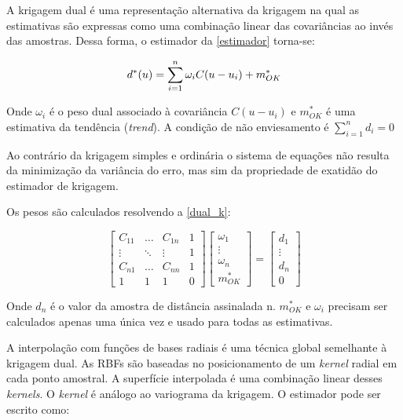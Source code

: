  \label{dksection}

A krigagem dual \cite{royer1984dual} é uma representação alternativa da krigagem na qual as estimativas são expressas como uma combinação linear das covariâncias ao invés das amostras. Dessa forma, o estimador da \autoref{estimador} torna-se:

\begin{equation}
\label{dk}
d^*(u)=\sum_{i=1}^{n} \omega_i C(u-u_i) + m^*_{OK} \\
\end{equation}

Onde $\omega_i$ é o peso dual associado à covariância $C(u-u_i)$ e $m^*_{OK}$ é uma estimativa da tendência (\textit{trend}). A condição de não enviesamento é $\sum_{i=1}^{n} d_i=0$

Ao contrário da krigagem simples e ordinária o sistema de equações não resulta da minimização da variância do erro, mas sim da propriedade de exatidão do estimador de krigagem.

Os pesos são calculados resolvendo a \autoref{dual_k}:

\begin{equation}
    \label{dual_k}
    \begin{bmatrix} 
    C_{11}&\dots&C_{1n}&1\\
    \vdots&\ddots&\vdots&1\\
    C_{n1}&\dots&C_{nn}&1\\ 
    1&1&1&0
    \end{bmatrix}
    \begin{bmatrix} 
    \omega_{1}\\
    \vdots\\
    \omega_{n}\\ 
    m^*_{OK}
    \end{bmatrix}
    =
    \begin{bmatrix} 
    d_{1}\\
    \vdots\\
    d_{n}\\ 
    0
    \end{bmatrix}
\end{equation}

Onde $d_{n}$ é o valor da amostra de distância assinalada n. $m^*_{OK}$ e $\omega_i$ precisam ser calculados apenas uma única vez e usado para todas as estimativas.


A interpolação com funções de bases radiais \cite{fasshauer2007meshfree} é uma técnica global semelhante à krigagem dual. As RBFs são baseadas no posicionamento de um \textit{kernel} radial em cada ponto amostral. A superfície interpolada é uma combinação linear desses \textit{kernels}. O \textit{kernel} é análogo ao variograma da krigagem. O estimador pode ser escrito como:

